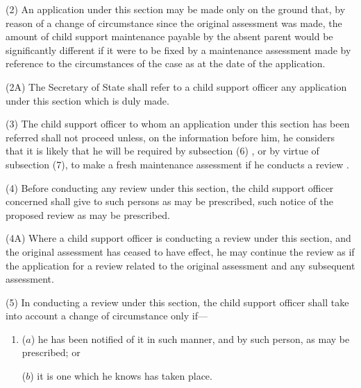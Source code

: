 \documentclass[12pt,a4paper]{article}
\begin{document}
(2) An application under this section may be made only on the ground that, by reason of a change of circumstance since the original assessment was made, the amount of child support maintenance payable by the absent parent would be significantly different if it were to be fixed by a maintenance assessment made by reference to the circumstances of the case as at the date of the application.

(2A) The Secretary of State shall refer to a child support officer any application under this section which is duly made.

(3) The child support officer to whom an application under this section has been referred shall not proceed unless, on the information before him, he considers that it is likely that he will be required by subsection (6)%
, or by virtue of subsection (7),  %
to make a fresh maintenance assessment if he conducts 
a review%
.

(4) Before conducting any review under this section, the child support officer concerned shall give to such persons as may be prescribed, such notice of the proposed review as may be prescribed.

(4A) Where a child support officer is conducting a review under this section, and the original assessment has ceased to have effect, he may continue the review as if the application for a review related to the original assessment and any subsequent assessment.


(5) In conducting a review under this section, the child support officer shall take into account a change of circumstance only if—
\begin{enumerate}\item[]
($a$) he has been notified of it in such manner, and by such person, as may be prescribed; or

($b$) it is one which he knows has taken place.
\end{enumerate}
\end{document}
